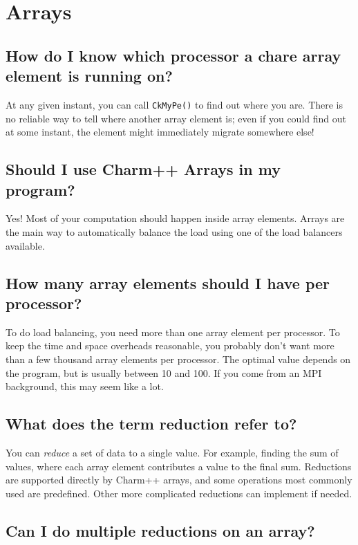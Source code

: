 \section{\charmpp{} Arrays}

\subsection{How do I know which processor a chare array element is running on?}

At any given instant, you can call {\tt CkMyPe()} to find out where
you are. There is no reliable way to tell where another array element is;
even if you could find out at some instant, the element might immediately
migrate somewhere else!

\subsection{Should I use Charm++ Arrays in my program?}

Yes! Most of your computation should happen inside array elements.
Arrays are the main way to automatically balance the load using one of the
load balancers available.

\subsection{How many array elements should I have per processor?}

To do load balancing, you need more than one array element per processor.
To keep the time and space overheads reasonable, you probably don't want
more than a few thousand array elements per processor. The optimal
value depends on the program, but is usually between 10 and 100.
If you come from an MPI background, this may seem like a lot.

\subsection{What does the term reduction refer to?}

You can {\em reduce} a set of data to a single value. For example,
finding the sum of values, where each array element contributes a value
to the final sum. Reductions are supported directly by Charm++ arrays, and some
operations most commonly used are predefined. Other more complicated reductions
can implement if needed.

\subsection{Can I do multiple reductions on an array?}

